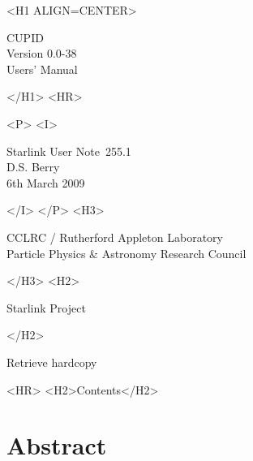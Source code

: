 \documentclass[twoside,11pt]{article}
\newcommand{\stardoccategory}  {Starlink User Note}
\newcommand{\stardocsource}    {sun\stardocnumber}
\newcommand{\stardocnumber}    {255.1}
\newcommand{\stardocauthors}   {D.S. Berry}
\newcommand{\stardocdate}      {6th March 2009}
\newcommand{\stardoctitle}     {CUPID}
\newcommand{\stardocversion}   {Version 0.0-38}
\newcommand{\stardocmanual}    {Users' Manual}
\newcommand{\htmladdnormallink}[2]{#1}
\newcommand{\htmladdimg}[1]{}
\newcommand{\htmlref}[2]{#1}
\newcommand{\htmladdtonavigation}[1]{}
\newcommand{\xlabel}[1]{}
\renewcommand{\_}{\texttt{\symbol{95}}}
\begin{document}
\begin{htmlonly}
   \xlabel{}
   \begin{rawhtml} <H1 ALIGN=CENTER> \end{rawhtml}
      \stardoctitle\\
      \stardocversion\\
      \stardocmanual
   \begin{rawhtml} </H1> <HR> \end{rawhtml}

   \begin{rawhtml} <P> <I> \end{rawhtml}
   \stardoccategory\ \stardocnumber \\
   \stardocauthors \\
   \stardocdate
   \begin{rawhtml} </I> </P> <H3> \end{rawhtml}
      \htmladdnormallink{CCLRC}{http://www.cclrc.ac.uk} /
      \htmladdnormallink{Rutherford Appleton Laboratory}
                        {http://www.cclrc.ac.uk/ral} \\
      \htmladdnormallink{Particle Physics \& Astronomy Research Council}
                        {http://www.pparc.ac.uk} \\
   \begin{rawhtml} </H3> <H2> \end{rawhtml}
      \htmladdnormallink{Starlink Project}{http://www.starlink.ac.uk/}
   \begin{rawhtml} </H2> \end{rawhtml}
   \htmladdnormallink{\htmladdimg{source.gif} Retrieve hardcopy}
      {http://www.starlink.ac.uk/cgi-bin/hcserver?\stardocsource}\\

  \label{stardoccontents}
  \begin{rawhtml}
    <HR>
    <H2>Contents</H2>
  \end{rawhtml}
  \htmladdtonavigation{\htmlref{\htmladdimg{contents_motif.gif}}
        {stardoccontents}}

  \section{\xlabel{abstract}Abstract}
\end{htmlonly}
\end{document}
